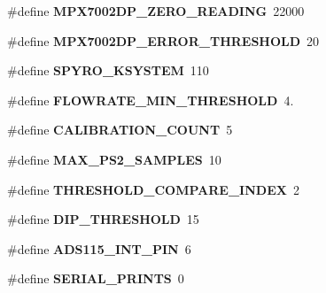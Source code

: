 \begin{DoxyCompactItemize}
\#define {\bfseries M\+P\+X7002\+D\+P\+\_\+\+Z\+E\+R\+O\+\_\+\+R\+E\+A\+D\+I\+NG}~22000
\item 
\mbox{\label{group___ventilator_module_gaa7c1c966e47a60c31b57f8b1133d11ab}} 
\#define {\bfseries M\+P\+X7002\+D\+P\+\_\+\+E\+R\+R\+O\+R\+\_\+\+T\+H\+R\+E\+S\+H\+O\+LD}~20
\item 
\mbox{\label{group___ventilator_module_ga457f7fbcd8a1d6af6e983092a8f2324d}} 
\#define {\bfseries S\+P\+Y\+R\+O\+\_\+\+K\+S\+Y\+S\+T\+EM}~110
\item 
\mbox{\label{group___ventilator_module_ga358ff678000319e95b3a4fb8025cdd8b}} 
\#define {\bfseries F\+L\+O\+W\+R\+A\+T\+E\+\_\+\+M\+I\+N\+\_\+\+T\+H\+R\+E\+S\+H\+O\+LD}~4.
\item 
\mbox{\label{group___ventilator_module_gaa9d67c9cd494973a854e3c8e3a0e2b0a}} 
\#define {\bfseries C\+A\+L\+I\+B\+R\+A\+T\+I\+O\+N\+\_\+\+C\+O\+U\+NT}~5
\item 
\mbox{\label{group___ventilator_module_ga55128a493bfb12e1f93dcf4d41204605}} 
\#define {\bfseries M\+A\+X\+\_\+\+P\+S2\+\_\+\+S\+A\+M\+P\+L\+ES}~10
\item 
\mbox{\label{group___ventilator_module_ga5ca45aefe4dc6f891e309ed7ef55926a}} 
\#define {\bfseries T\+H\+R\+E\+S\+H\+O\+L\+D\+\_\+\+C\+O\+M\+P\+A\+R\+E\+\_\+\+I\+N\+D\+EX}~2
\item 
\mbox{\label{group___ventilator_module_ga573df49862c06c88a491fb0f8de15312}} 
\#define {\bfseries D\+I\+P\+\_\+\+T\+H\+R\+E\+S\+H\+O\+LD}~15
\item 
\mbox{\label{group___ventilator_module_ga523b7e982dca567dfe2f8ba0f446c7fd}} 
\#define {\bfseries A\+D\+S115\+\_\+\+I\+N\+T\+\_\+\+P\+IN}~6
\item 
\mbox{\label{group___ventilator_module_ga062f9aa61d0d0eccd1c049728941ba67}} 
\#define {\bfseries S\+E\+R\+I\+A\+L\+\_\+\+P\+R\+I\+N\+TS}~0
\item 
\mbox{\label{group___ventilator_module_ga120382948bfac000620a8fc076fbfa7e}} 

\end{DoxyCompactItemize}
